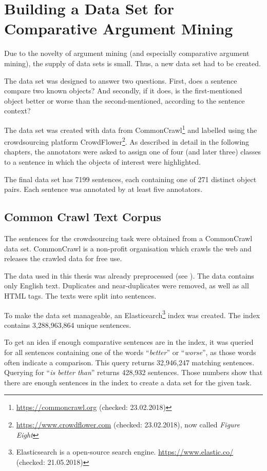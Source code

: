 \FloatBarrier
\chapter{Building a Data Set for Comparative Argument Mining}
\label{chp:dataset}
\label{sec:prestudy}
Due to the novelty of argument mining (and especially comparative argument mining), the supply of data sets is small. Thus, a new data set had to be created.

The data set was designed to answer two questions. First, does a sentence compare two known objects? And secondly, if it does, is the first-mentioned object better or worse than the second-mentioned, according to the sentence context?

The data set was created with data from CommonCrawl\footnote{\url{https://commoncrawl.org} (checked: 23.02.2018)}  and labelled using the crowdsourcing platform CrowdFlower\footnote{\url{https://www.crowdflower.com} (checked: 23.02.2018), now called \emph{Figure Eight}}. As described in detail in the following chapters, the annotators were asked to assign one of four (and later three) classes to a sentence in which the objects of interest were highlighted.

The final data set has 7199 sentences, each containing one of 271 distinct object pairs. Each sentence was annotated by at least five annotators.

\section{Common Crawl Text Corpus}
The sentences for the crowdsourcing task were obtained from a CommonCrawl data set. CommonCrawl is a non-profit organisation which crawls the web and releases the crawled data for free use.

The data used in this thesis was already preprocessed (see \cite{Panchenko:2017aa}). The data contains only English text. Duplicates and near-duplicates were removed, as well as all HTML tags. The texts were split into sentences.

To make the data set manageable, an Elasticearch\footnote{Elasticsearch is a open-source search engine. \url{https://www.elastic.co/} (checked: 21.05.2018)} index was created. The index contains 3,288,963,864 unique sentences.

To get an idea if enough comparative sentences are in the index, it was queried for all sentences containing one of the words \enquote{\emph{better}} or \enquote{\emph{worse}},  as those words often indicate a comparison. This query returns 32,946,247 matching sentences. Querying for \enquote{\emph{is better than}} returns 428,932 sentences. Those numbers show that there are enough sentences in the index to create a data set for the given task.


